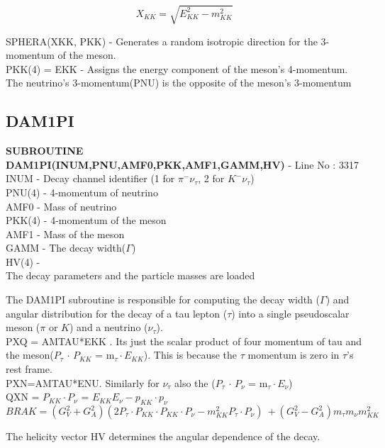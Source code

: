 \documentclass[12pt]{article}
\begin{document}
\[X_{KK} = \sqrt{E_{KK}^2-m_{KK}^2}\]

SPHERA(XKK, PKK) - Generates a random isotropic direction for the 3-momentum of the meson.\\
PKK(4) = EKK - Assigns the energy component of the meson's 4-momentum.\\
The neutrino’s 3-momentum(PNU) is the opposite of the meson's 3-momentum \\

\subsection{DAM1PI}
\textbf{SUBROUTINE DAM1PI(INUM,PNU,AMF0,PKK,AMF1,GAMM,HV)} - Line No : 3317\\

INUM - Decay channel identifier (1 for $\pi^- \nu_\tau$, 2 for $K^-\nu_\tau$)\\
PNU(4) - 4-momentum of neutrino\\
AMF0 - Mass of neutrino\\
PKK(4) - 4-momentum of the meson\\
AMF1 - Mass of the meson\\
GAMM - The decay width($\Gamma$)\\
HV(4) - \\

The decay parameters and the particle masses are loaded

The DAM1PI subroutine is responsible for computing the decay width ($\Gamma$) and angular distribution for the decay of a tau lepton ($\tau$) into a single pseudoscalar meson ($\pi$ or $K$) and a neutrino ($\nu_\tau$).\\


PXQ = AMTAU*EKK . Its just the scalar product of four momentum of tau and the meson($P_{\tau}$ $\cdot$ $P_{KK}$ = m$_\tau \cdot E_{KK}$). This is because the $\tau$ momentum is zero in $\tau$'s rest frame.\\

PXN=AMTAU*ENU. Similarly for $\nu_\tau$ also the ($P_{\tau}$ $\cdot$ $P_{\nu}$ = m$_\tau \cdot E_\nu$)\\

QXN = $P_{KK} \cdot P_\nu$ = $E_{KK}E_\nu - p_{KK} \cdot p_\nu$\\

\[BRAK = (G_V^2+G_A^2)(2P_\tau \cdot P_{KK} \cdot P_{KK} \cdot P_\nu - m_{KK}^2 P_\tau \cdot P_\nu)\ + (G_V^2 - G_A^2) m_\tau m_\nu m_{KK}^2 \]

The helicity vector HV determines the angular dependence of the decay.
\end{document}
